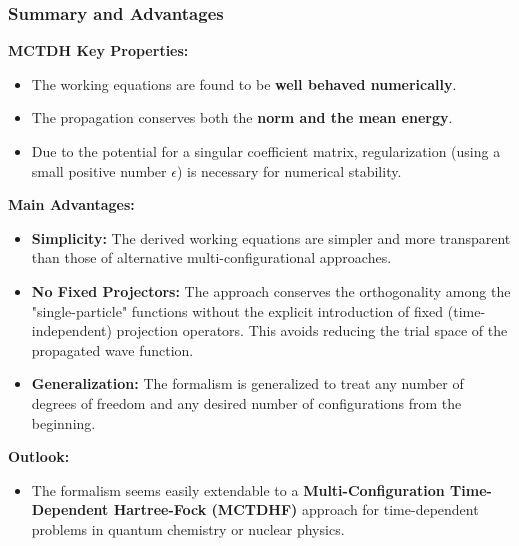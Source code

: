 \begin{frame}
    \frametitle{Summary and Advantages}
    
    \textbf{MCTDH Key Properties:}
    \begin{itemize}
        \item The working equations are found to be \textbf{well behaved numerically}.
        \item The propagation conserves both the \textbf{norm and the mean energy}.
        \item Due to the potential for a singular coefficient matrix, regularization (using a small positive number $\epsilon$) is necessary for numerical stability.
    \end{itemize}
\end{frame}
\begin{frame}
    \textbf{Main Advantages:}
    \begin{itemize}
        \item \textbf{Simplicity:} The derived working equations are simpler and more transparent than those of alternative multi-configurational approaches.
        \item \textbf{No Fixed Projectors:} The approach conserves the orthogonality among the "single-particle" functions without the explicit introduction of fixed (time-independent) projection operators. This avoids reducing the trial space of the propagated wave function.
        \item \textbf{Generalization:} The formalism is generalized to treat any number of degrees of freedom and any desired number of configurations from the beginning.
    \end{itemize}
    
    \textbf{Outlook:}
    \begin{itemize}
        \item The formalism seems easily extendable to a \textbf{Multi-Configuration Time-Dependent Hartree-Fock (MCTDHF)} approach for time-dependent problems in quantum chemistry or nuclear physics.
    \end{itemize}

\end{frame}


